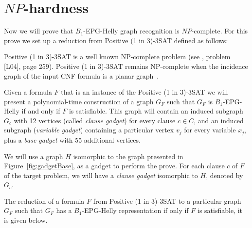 \documentclass[9pt]{entcs}
\begin{document}
\section{$NP$-hardness}\label{sec:sectionDispositivoClausula}

Now we will prove that  $B_1$-EPG-Helly graph recognition is $NP$-complete. For this prove we set up a reduction from {\sc Positive (1 in 3)-3SAT} defined  as follows:



{\sc Positive (1 in 3)-3SAT } is a well known NP-complete problem (see \cite{johnson1979}, problem [L04], page 259). {\sc Positive (1 in 3)-3SAT} remains NP-complete when the incidence graph of the input CNF formula is a planar graph~\cite{mulzer2008minimum}.

Given a formula $F$ that is an instance of the {\sc Positive (1 in 3)-3SAT} we will present a polynomial-time construction of a graph $ G_F$ such that $ G_F $ is $ B_1$-EPG-Helly if and only if $ F $ is satisfiable. This graph will contain an induced subgraph $ G_c$ with 12 vertices (called \emph {clause gadget}) for every clause $ c \in C $, and an induced subgraph (\emph {variable gadget}) containing a particular vertex  $ v_j$ for every variable $ x_j$, plus a \emph{base gadget}  with 55 additional vertices.

We will use a graph $H$ isomorphic to the graph presented in Figure~\ref{fig:gadgetBase}, as a gadget to perform the prove. For each clause $c$ of $F$ of the target problem, we will have a \emph{clause gadget} isomorphic to $H$, denoted by $G_c$. %

 


The reduction of a formula $F$ from  {\sc Positive (1 in 3)-3SAT}  to a particular graph $G_F$ such that $G_F$ has a $B_{1}$-EPG-Helly representation if only if $F$ is satisfiable, it is given below.
\end{document}
